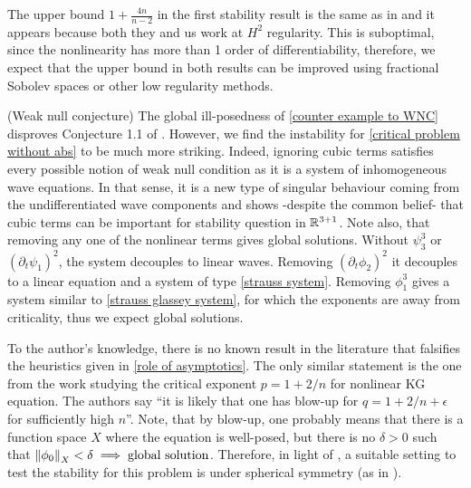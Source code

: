 \documentclass[11pt, oneside]{amsart}
\begin{document}
	\begin{remark}
		The upper bound $1+\frac{4n}{n-2}$ in the first stability result is the same as in \cite{hidano_glassey_2012} and it appears because both they and us work at $H^2$ regularity. This is suboptimal, since the nonlinearity has more than 1 order of differentiability, therefore, we expect that the upper bound in both results can be improved using fractional Sobolev spaces or other low regularity methods.
	\end{remark}

	\begin{remark}(Weak null conjecture)
		The global ill-posedness of \cref{counter example to WNC} disproves Conjecture 1.1 of \cite{deng_global_2018}. However, we find the instability for \cref{critical problem without abs} to be much more striking. Indeed, ignoring cubic terms satisfies every possible notion of weak null condition as it is a system of inhomogeneous wave equations. In that sense, it is a new type of singular behaviour coming from the undifferentiated wave components and shows -despite the common belief- that cubic terms can be important for stability question in $\mathbb{R}^{3+1}$. Note also, that removing any one of the nonlinear terms gives global solutions. Without $\psi_3^3$ or $(\partial_t\psi_1)^2$, the system decouples to linear waves. Removing $(\partial_t\phi_2)^2$ it decouples to a linear equation and a system of type \cref{strauss system}. Removing $\phi_1^3$ gives a system similar to \cref{strauss glassey system}, for which the exponents are away from criticality, thus we expect global solutions.
	\end{remark}
	
	\begin{remark}
	To the author's knowledge, there is no known result in the literature that falsifies the heuristics given in \cref{role of asymptotics}. The only similar statement is the one from the work \cite{keel_small_1999} studying the critical exponent $p=1+2/n$ for nonlinear KG equation. The authors say \enquote{it is likely that one has blow-up for $q=1+2/n+\epsilon$ for sufficiently high $n$}. Note, that by blow-up, one probably means that there is a function space $X$ where the equation is well-posed, but there is no $\delta>0$ such that $\left\lVert \phi_0\right\rVert_X<\delta\implies \text{global solution}$. Therefore, in light of \cite{lindblad_sharp_1993}, a suitable setting to test the stability for this problem is under spherical symmetry (as in \cite{hidano_glassey_2012}).
	\end{remark}
\end{document}
